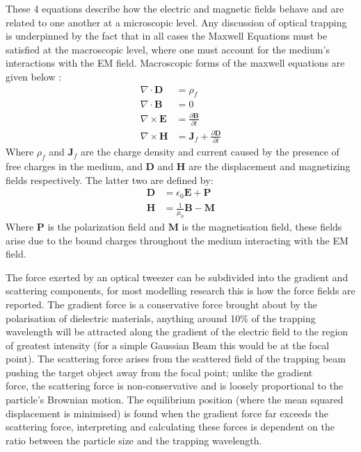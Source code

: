 These 4 equations describe how the electric and magnetic fields behave
and are related to one another at a microscopic level. Any discussion 
of optical trapping is underpinned by the fact that in all cases the 
Maxwell Equations must be satisfied at the macroscopic level, where 
one must account for the medium's interactions with the EM field. 
Macroscopic forms of the maxwell equations are given below \cite{Jackson_1975}:
\begin{align}
	\nabla \cdot \mathbf{D}
	&= \rho_f
	\\
	\nabla \cdot \mathbf{B}
	&= 0
	\\
	\nabla \times \mathbf{E}
	&= \frac{\partial \mathbf{B}}{\partial t}
	\\
	\nabla \times \mathbf{H}
	&= \mathbf{J}_f +\frac{\partial \mathbf{D}}{\partial t}  
\end{align}
Where $\rho_f$ and $\mathbf{J}_f$ are the charge density and current 
caused by the presence of free charges in the medium, and $\mathbf{D}$ 
and $\mathbf{H}$ are the displacement and magnetizing fields respectively. 
The latter two are defined by:
\begin{align}
	\nonumber
	\mathbf{D} &= \epsilon_0\mathbf{E}+\mathbf{P} 
	\\ 
	\nonumber
	\mathbf{H} &= \frac{1}{\mu_0}\mathbf{B}-\mathbf{M}
\end{align}
Where $\mathbf{P}$ is the polarization field and $\mathbf{M}$ is the 
magnetisation field, these fields arise due to the bound charges 
throughout the medium interacting with the EM field. 
 
The force exerted by an optical tweezer can be subdivided into the 
gradient and scattering components, for most modelling research this 
is how the force fields are reported. The gradient force is a conservative 
force brought about by the polarisation of dielectric materials, 
anything around 10\% of the trapping wavelength will be attracted along 
the gradient of the electric field to the region of greatest intensity 
(for a simple Gaussian Beam this would be at the focal point). The 
scattering force arises from the scattered field of the trapping beam 
pushing the target object away from the focal point; unlike the gradient \\
force, the scattering force is non-conservative and is loosely 
proportional to the particle's Brownian motion. The equilibrium position 
(where the mean squared displacement is minimised) is found when the 
gradient force far exceeds the scattering force, interpreting and 
calculating these forces is dependent on the ratio between the particle 
size and the trapping wavelength.


